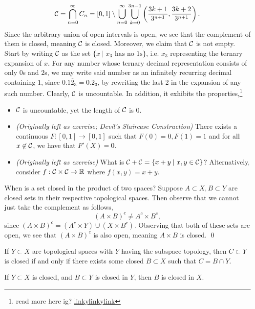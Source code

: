 \[ \mathcal C = \bigcap_{n=0}^\infty C_n = [0, 1] \setminus \bigcup_{n=0}^\infty \bigcup_{k=0}^{3n-1} \left(\frac{3k+1}{3^{n+1}}, \frac{3k+2}{3^{n+1}}\right). \]
Since the arbitrary union of open intervals is open, we see that the complement of them is closed, meaning $\mathcal C$ is closed. Moreover, we claim that $\mathcal C$ is not empty. Start by writing $\mathcal C$ as the set $\{x \mid x_3 \text{ has no } 1\text{s}\}$, i.e. $x_3$ representing the ternary expansion of $x$. For any number whose ternary decimal representation consists of only $0$s and $2$s, we may write said number as an infinitely recurring decimal containing $1$, since $0.1\overline{2}_3 = 0.2_3$, by rewriting the last $2$ in the expansion of any such number.
\medskip\newline
\noindent Clearly, $\mathcal C$ is uncountable. In addition, it exhibits the properties,\footnote{read more here ig? \href{https://en.wikipedia.org/wiki/Cantor_set}{linkylinkylink}}
\begin{itemize}
    \item $\mathcal C$ is uncountable, yet the length of $\mathcal C$ is $0$.
    \item \textit{(Originally left as exercise; Devil's Staircase Construction)} There exists a continuous $F : [0, 1] \to [0, 1]$ such that $F(0) = 0, F(1) = 1$ and for all $x \not\in \mathcal C$, we have that $F'(X) = 0$.
    \item \textit{(Originally left as exercise)} What is $\mathcal C + \mathcal C = \{x + y \mid x, y \in \mathcal C\}$? Alternatively, consider $f : \mathcal C \times \mathcal C \to \mathbb R$ where $f(x, y) = x + y$.
\end{itemize}

\newpage
\noindent When is a set closed in the product of two spaces? Suppose $A \subset X, B \subset Y$ are closed sets in their respective topological spaces. Then observe that we cannot just take the complement as follows,
\[ (A \times B)^c \neq A^c \times B^c, \]
since $(A \times B)^c = (A^c \times Y) \cup (X \times B^c)$. Observing that both of these sets are open, we see that $(A \times B)^c$ is also open, meaning $A \times B$ is closed. \qed

\begin{simpleclaim}
    If $Y \subset X$ are topological spaces with $Y$ having the subspace topology, then $C \subset Y$ is closed if and only if there exists some closed $B \subset X$ such that $C = B \cap Y$.
\end{simpleclaim}
\begin{simpleclaim}
    If $Y \subset X$ is closed, and $B \subset Y$ is closed in $Y$, then $B$ is closed in $X$.
\end{simpleclaim}

